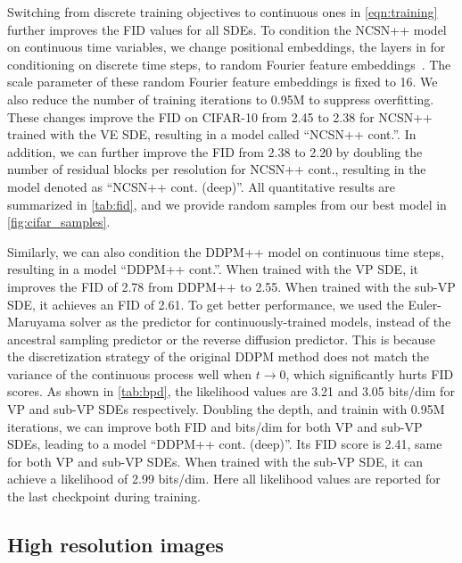 Switching from discrete training objectives to continuous ones in \cref{eqn:training} further improves the FID values for all SDEs. To condition the NCSN++ model on continuous time variables, we change positional embeddings, the layers in \citet{ho2020denoising} for conditioning on discrete time steps, to random Fourier feature embeddings~\citep{tancik2020fourfeat}. The scale parameter of these random Fourier feature embeddings is fixed to 16. We also reduce the number of training iterations to 0.95M to suppress overfitting. These changes improve the FID on CIFAR-10 from 2.45 to 2.38 for NCSN++ trained with the VE SDE, resulting in a model called ``NCSN++ cont.''. In addition, we can further improve the FID from 2.38 to 2.20 by doubling the number of residual blocks per resolution for NCSN++ cont., resulting in the model denoted as ``NCSN++ cont. (deep)''. All quantitative results are summarized in \cref{tab:fid}, and we provide random samples from our best model in \cref{fig:cifar_samples}. 

Similarly, we can also condition the DDPM++ model on continuous time steps, resulting in a model ``DDPM++ cont.''. When trained with the VP SDE, it improves the FID of 2.78 from DDPM++ to 2.55. When trained with the sub-VP SDE, it achieves an FID of 2.61. To get better performance, we used the Euler-Maruyama solver as the predictor for continuously-trained models, instead of the ancestral sampling predictor or the reverse diffusion predictor. This is because the discretization strategy of the original DDPM method does not match the variance of the continuous process well when $t\to 0$, which significantly hurts FID scores. As shown in \cref{tab:bpd}, the likelihood values are 3.21 and 3.05 bits/dim for VP and sub-VP SDEs respectively. Doubling the depth, and trainin with 0.95M iterations, we can improve both FID and bits/dim for both VP and sub-VP SDEs, leading to a model ``DDPM++ cont. (deep)''. Its FID score is 2.41, same for both VP and sub-VP SDEs. When trained with the sub-VP SDE, it can achieve a likelihood of 2.99 bits/dim. Here all likelihood values are reported for the last checkpoint during training.



\subsection{High resolution images} 
\label{app:hq}

